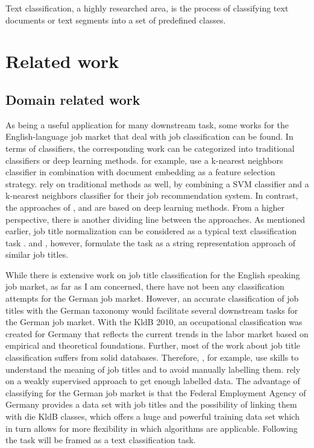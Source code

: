 \documentclass[12pt, a4paper, titlepage]{article}
\begin{document}
Text classification, a highly researched area, is the process of classifying text documents or text segments into a set of predefined classes. 



\section{Related work}
\subsection*{Domain related work}
As being a useful application for many downstream task, some works for the English-language job market that deal with job classification can be found. In terms of classifiers, the corresponding work can be categorized into traditional classifiers or deep learning methods. \cite{Zhu2017} for example, use a k-nearest neighbors classifier in combination with document embedding as a feature selection strategy. \cite{Javed2015} rely on traditional methods as well, by combining a \ac{SVM} classifier and a k-nearest neighbors classifier for their job recommendation system. In contrast, the approaches of \cite{Decorte2021}, \cite{WangJ2019} and \cite{Neculoiu2016} are based on deep learning methods. From a higher perspective, there is another dividing line between the approaches. As mentioned earlier, job title normalization can be considered as a typical text classification task \citep{WangJ2019, Javed2015, Zhu2017}. \cite{Decorte2021} and \cite{Neculoiu2016}, however, formulate the task as a string representation approach of similar job titles. 

While there is extensive work on job title classification for the English speaking job market, as far as I am concerned, there have not been any classification attempts for the German job market. However, an accurate classification of job titles with the German taxonomy would facilitate several downstream tasks for the German job market. With the KldB 2010, an occupational classification was created for Germany that reflects the current trends in the labor market based on empirical and theoretical foundations. Further, most of the work about job title classification suffers from solid databases. Therefore, \cite{Decorte2021}, for example, use skills to understand the meaning of job titles and to avoid manually labelling them. \cite{Javed2015} rely on a weakly supervised approach to get enough labelled data. The advantage of classifying for the German job market is that the Federal Employment Agency of Germany provides a data set with job titles and the possibility of linking them with die KldB classes, which offers a huge and powerful training data set which in turn allows for more flexibility in which algorithms are applicable. Following \citet{WangJ2019, Javed2015, Zhu2017} the task will be framed as a text classification task. 
\end{document}
